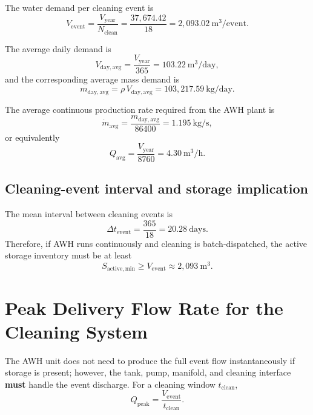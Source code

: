 \documentclass[11pt,a4paper]{article}
\begin{document}
The water demand per cleaning event is
\begin{equation}
V_{\mathrm{event}}=\frac{V_{\mathrm{year}}}{N_{\mathrm{clean}}}
=\frac{37{,}674.42}{18}
=2{,}093.02\ \mathrm{m^3/event}.
\end{equation}

The average daily demand is
\begin{equation}
V_{\mathrm{day,avg}}=\frac{V_{\mathrm{year}}}{365}
=103.22\ \mathrm{m^3/day},
\end{equation}
and the corresponding average mass demand is
\begin{equation}
m_{\mathrm{day,avg}}=\rho\,V_{\mathrm{day,avg}}
=103{,}217.59\ \mathrm{kg/day}.
\end{equation}

The average continuous production rate required from the AWH plant is
\begin{equation}
\dot{m}_{\mathrm{avg}}=\frac{m_{\mathrm{day,avg}}}{86400}
=1.195\ \mathrm{kg/s},
\end{equation}
or equivalently
\begin{equation}
Q_{\mathrm{avg}}=\frac{V_{\mathrm{year}}}{8760}
=4.30\ \mathrm{m^3/h}.
\end{equation}

\subsection{Cleaning-event interval and storage implication}
The mean interval between cleaning events is
\begin{equation}
\Delta t_{\mathrm{event}}=\frac{365}{18}=20.28\ \mathrm{days}.
\end{equation}
Therefore, if AWH runs continuously and cleaning is batch-dispatched, the active storage inventory must be at least
\begin{equation}
S_{\mathrm{active,min}}\ge V_{\mathrm{event}} \approx 2{,}093\ \mathrm{m^3}.
\end{equation}

\section{Peak Delivery Flow Rate for the Cleaning System}
The AWH unit does not need to produce the full event flow instantaneously if storage is present; however, the tank, pump, manifold, and cleaning interface \textbf{must} handle the event discharge. For a cleaning window $t_{\mathrm{clean}}$,
\begin{equation}
Q_{\mathrm{peak}}=\frac{V_{\mathrm{event}}}{t_{\mathrm{clean}}}.
\end{equation}
\end{document}
